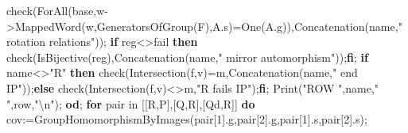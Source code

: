 \documentclass[
  10pt,
  letterpaper,
]{article}
\newenvironment{Shaded}{}{}
\newcommand{\BuiltInTok}[1]{\textcolor[rgb]{0.00,0.50,0.00}{#1}}
\newcommand{\ConstantTok}[1]{\textcolor[rgb]{0.53,0.00,0.00}{#1}}
\newcommand{\ControlFlowTok}[1]{\textcolor[rgb]{0.00,0.44,0.13}{\textbf{#1}}}
\newcommand{\ExtensionTok}[1]{#1}
\newcommand{\FloatTok}[1]{\textcolor[rgb]{0.25,0.63,0.44}{#1}}
\newcommand{\NormalTok}[1]{#1}
\newcommand{\OperatorTok}[1]{\textcolor[rgb]{0.40,0.40,0.40}{#1}}
\newcommand{\StringTok}[1]{\textcolor[rgb]{0.25,0.44,0.63}{#1}}
\newcommand{\VariableTok}[1]{\textcolor[rgb]{0.10,0.09,0.49}{#1}}
\begin{document}
\begin{Shaded}
\begin{Highlighting}[]
 \VariableTok{check}\NormalTok{(}\BuiltInTok{ForAll}\NormalTok{(}\VariableTok{base}\OperatorTok{,}\VariableTok{w}\OperatorTok{{-}\textgreater{}}\BuiltInTok{MappedWord}\NormalTok{(}\VariableTok{w}\OperatorTok{,}\BuiltInTok{GeneratorsOfGroup}\NormalTok{(}\VariableTok{F}\NormalTok{)}\OperatorTok{,}\VariableTok{A}\NormalTok{.}\VariableTok{s}\NormalTok{)}\OperatorTok{=}\BuiltInTok{One}\NormalTok{(}\VariableTok{A}\NormalTok{.}\VariableTok{g}\NormalTok{))}\OperatorTok{,}\BuiltInTok{Concatenation}\NormalTok{(}\VariableTok{name}\OperatorTok{,}\StringTok{" rotation relations"}\NormalTok{))}\OperatorTok{;}
 \ControlFlowTok{if} \VariableTok{reg}\OperatorTok{\textless{}\textgreater{}}\ConstantTok{fail} \ControlFlowTok{then} \VariableTok{check}\NormalTok{(}\BuiltInTok{IsBijective}\NormalTok{(}\VariableTok{reg}\NormalTok{)}\OperatorTok{,}\BuiltInTok{Concatenation}\NormalTok{(}\VariableTok{name}\OperatorTok{,}\StringTok{" mirror automorphism"}\NormalTok{))}\OperatorTok{;}\ControlFlowTok{fi}\OperatorTok{;}
 \ControlFlowTok{if} \VariableTok{name}\OperatorTok{\textless{}\textgreater{}}\StringTok{"R"} \ControlFlowTok{then} \VariableTok{check}\NormalTok{(}\BuiltInTok{Intersection}\NormalTok{(}\VariableTok{f}\OperatorTok{,}\VariableTok{v}\NormalTok{)}\OperatorTok{=}\VariableTok{m}\OperatorTok{,}\BuiltInTok{Concatenation}\NormalTok{(}\VariableTok{name}\OperatorTok{,}\StringTok{" end IP"}\NormalTok{))}\OperatorTok{;}\ControlFlowTok{else} \VariableTok{check}\NormalTok{(}\BuiltInTok{Intersection}\NormalTok{(}\VariableTok{f}\OperatorTok{,}\VariableTok{v}\NormalTok{)}\OperatorTok{\textless{}\textgreater{}}\VariableTok{m}\OperatorTok{,}\StringTok{"R fails IP"}\NormalTok{)}\OperatorTok{;}\ControlFlowTok{fi}\OperatorTok{;}
 \BuiltInTok{Print}\NormalTok{(}\StringTok{"ROW "}\OperatorTok{,}\VariableTok{name}\OperatorTok{,}\StringTok{" "}\OperatorTok{,}\VariableTok{row}\OperatorTok{,}\StringTok{"\textbackslash{}n"}\NormalTok{)}\OperatorTok{;}
\ControlFlowTok{od}\OperatorTok{;}
\ControlFlowTok{for} \VariableTok{pair} \ExtensionTok{in}\NormalTok{ [[}\VariableTok{R}\OperatorTok{,}\VariableTok{P}\NormalTok{]}\OperatorTok{,}\NormalTok{[}\VariableTok{Q}\OperatorTok{,}\VariableTok{R}\NormalTok{]}\OperatorTok{,}\NormalTok{[}\VariableTok{Qd}\OperatorTok{,}\VariableTok{R}\NormalTok{]] }\ControlFlowTok{do}
 \VariableTok{cov}\OperatorTok{:=}\BuiltInTok{GroupHomomorphismByImages}\NormalTok{(}\VariableTok{pair}\NormalTok{[}\FloatTok{1}\NormalTok{].}\VariableTok{g}\OperatorTok{,}\VariableTok{pair}\NormalTok{[}\FloatTok{2}\NormalTok{].}\VariableTok{g}\OperatorTok{,}\VariableTok{pair}\NormalTok{[}\FloatTok{1}\NormalTok{].}\VariableTok{s}\OperatorTok{,}\VariableTok{pair}\NormalTok{[}\FloatTok{2}\NormalTok{].}\VariableTok{s}\NormalTok{)}\OperatorTok{;}

\end{Highlighting}
\end{Shaded}
\end{document}
